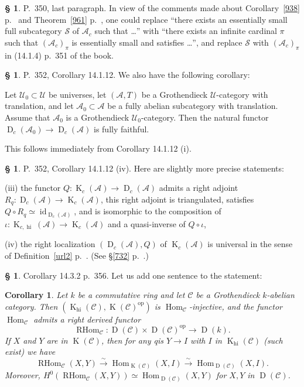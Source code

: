 \documentclass[12pt]{article}%
\newtheorem{cor}[thm]{Corollary}
\theoremstyle{remark}
\theoremstyle{definition}
\newtheorem{s}[thm]{\S}%
\newcommand{\nn}{\noindent}
\newcommand{\cc}{\mathcal}
\newcommand{\oo}{\operatorname}
\newcommand{\A}{\mathcal A}
\newcommand{\C}{\mathcal C}
\newcommand{\U}{\mathcal U}
\newcommand{\xr}{\xrightarrow}
\DeclareMathOperator{\D}{D}
\DeclareMathOperator{\id}{id}
\DeclareMathOperator{\Hom}{Hom}%
\DeclareMathOperator{\op}{op}
\begin{document}
%

\begin{s} 
P.~350, last paragraph. In view of the comments made about Corollary~\ref{938} p.~\pageref{938} and Theorem~\ref{961} p.~\pageref{961}, one could replace ``there exists an essentially small full subcategory $\cc S$ of $\A_c$ such that \dots'' with ``there exists an infinite cardinal $\pi$ such that $(\A_c)_\pi$ is essentially small and satisfies \dots'', and replace $\cc S$ with $(\A_c)_\pi$ in (14.1.4) p.~351 of the book.
\end{s}

%

\begin{s}\label{14112}
P.~352, Corollary 14.1.12. We also have the following corollary: 

Let $\U_0\subset\U$ be universes, let $(\A,T)$ be a Grothendieck $\U$-category with translation, and let $\A_0\subset\A$ be a fully abelian subcategory with translation. Assume that $\A_0$ is a Grothendieck $\U_0$-category. Then the natural functor $\D_c(\A_0)\to\D_c(\A)$ is fully faithful.

This follows immediately from Corollary 14.1.12 (i). 
\end{s}

%

\begin{s} 
P.~352, Corollary 14.1.12 (iv). Here are slightly more precise statements:

\nn(iii) the functor $Q:\oo K_c(\A)\to\oo D_c(\A)$ admits a right adjoint $R_q:\oo D_c(\A)\to\oo K_c(\A)$, this right adjoint is triangulated, satisfies $Q\circ R_q\simeq\id_{\oo D_c(\A)}$, and is isomorphic to the composition of $\iota:\oo K_{c,\oo{hi}}(\A)\to\oo K_c(\A)$ and a quasi-inverse of $Q\circ\iota$,

\nn(iv) the right localization $(\oo D_c(\A),Q)$ of $\oo K_c(\A)$ is universal in the sense of Definition~\ref{url2} p.~\pageref{url2}. (See \S\ref{732} p.~\pageref{732}.)
\end{s}

%

\begin{s}%
Corollary 14.3.2 p.~356. Let us add one sentence to the statement:
%
\begin{cor}\label{1432}
Let $k$ be a commutative ring and let $\C$ be a Grothendieck $k$-abelian category. Then $(\oo K_{\oo{hi}}(\C),\oo K(\C)^{\op})$ is $\Hom_\C$-injective, and the functor $\Hom_\C$ admits a right derived functor 
$$
\oo{RHom}_\C:\oo D(\C)\times\oo D(\C)^{\op}\to\oo D(k).
$$ 
If $X$ and $Y$ are in $\oo K(\C)$, then for any qis $Y\to I$ with $I$ in $\oo K_{\oo{hi}}(\C)$ (such exist) we have 
$$
\oo{RHom}_\C(X,Y)\xr\sim\Hom_{\oo K(\C)}(X,I)\xr\sim\Hom_{\oo D(\C)}(X,I).
$$ 
Moreover, $H^0(\oo{RHom}_\C(X,Y))\simeq\Hom_{\oo D(\C)}(X,Y)$ for $X,Y$ in $\oo D(\C)$.
\end{cor}
\end{s}
\end{document}
